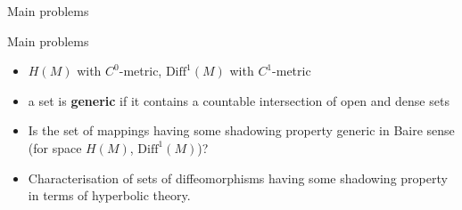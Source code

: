 \documentclass{beamer}
\begin{document}
\begin{section}{Main problems}
\begin{frame}{Main problems}
\begin{itemize}
  \item $H(M)$ with $C^0$-metric, $\mbox{Diff}^1(M)$ with $C^1$-metric

  \item a set is \textbf{generic} if it contains a countable intersection of open and dense sets 

	\item[(P1)] Is the set of mappings having some shadowing property generic in Baire sense (for space $H(M)$, $\mbox{Diff}^1(M)$)? 
	
	\item[(P2)] Characterisation of sets of diffeomorphisms having some shadowing property in terms of hyperbolic theory.
\end{itemize}
\end{frame}
\end{section}
\end{document}
